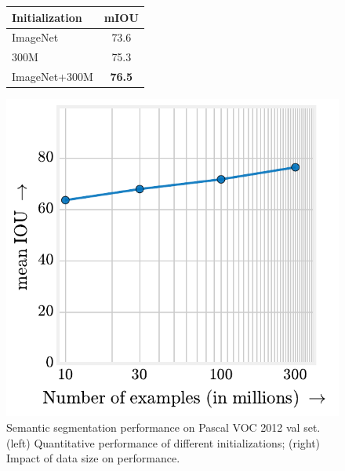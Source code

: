 \documentclass[10pt,twocolumn,letterpaper]{article}
\begin{document}
\begin{figure}
\centering
\begin{minipage}{0.25\textwidth}
   \centering
   \begin{tabular}{@{}l | c@{}}
Initialization & mIOU\\
\hline
ImageNet & 73.6 \\
300M & 75.3 \\
ImageNet+300M & \textbf{76.5}\\
\end{tabular}
\end{minipage}%
\begin{minipage}{0.49\columnwidth}
   \centering
  \includegraphics[width=\columnwidth]{seg_data_perf_notext}
\end{minipage}%
\vspace{0.01in}
\caption{Semantic segmentation performance on Pascal VOC 2012 val set. (left) Quantitative performance of different initializations; (right) Impact of data size on performance.}
\label{tab:segmentation}
\end{figure}
\end{document}
